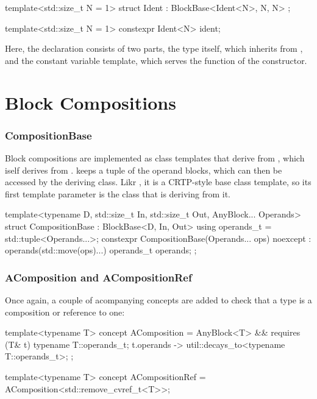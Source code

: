 \begin{cppcodenl}
  template<std::size_t N = 1>
  struct Ident : BlockBase<Ident<N>, N, N> {};

  template<std::size_t N = 1>
  constexpr Ident<N> ident;
\end{cppcodenl}

Here, the declaration consists of two parts, the  type itself, which inherits from , and the constant
 variable template, which serves the function of the constructor.

\section{Block Compositions}

\subsubsection{CompositionBase}

Block compositions are implemented as class templates that derive from , which iself
derives from
.  keeps a tuple of the operand blocks, which can then be accessed by
the deriving class. Likr , it is a CRTP-style base class template, so its first
template parameter is the class that is deriving from it.

\begin{cppcodenl}
  template<typename D, std::size_t In, std::size_t Out, AnyBlock... Operands>
  struct CompositionBase : BlockBase<D, In, Out> {
    using operands_t = std::tuple<Operands...>;
    constexpr CompositionBase(Operands... ops) noexcept : operands(std::move(ops)...) {}
    operands_t operands;
  };
\end{cppcodenl}

\subsubsection{AComposition and ACompositionRef}
Once again, a couple of acompanying concepts are added to check that a type  is a
composition or reference to one:

\begin{cppcodenl}
  template<typename T>
  concept AComposition = AnyBlock<T> && requires (T& t) {
    typename T::operands_t;
    { t.operands } -> util::decays_to<typename T::operands_t>;
  };

  template<typename T>
  concept ACompositionRef = AComposition<std::remove_cvref_t<T>>;
\end{cppcodenl}

